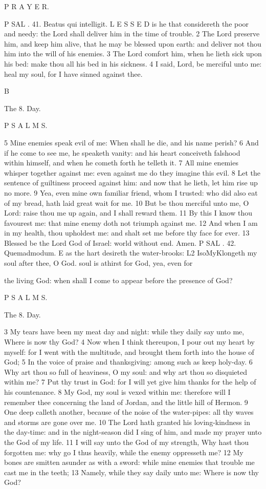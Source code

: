 P R A Y E R.

P SAL . 41. Beatus qui intelligit. L E S S E D is he that considereth the poor and needy: the Lord shall deliver him in the time of trouble. 2 The Lord preserve him, and keep him alive, that he may be blessed upon earth: and deliver not thou him into the will of his enemies. 3 The Lord comfort him, when he lieth sick upon his bed: make thou all his bed in his sickness. 4 I said, Lord, be merciful unto me: heal my soul, for I have sinned against thee.

B

The 8. Day.

P S A L M S.

5 Mine enemies speak evil of me: When shall he die, and his name perish? 6 And if he come to see me, he speaketh vanity: and his heart conceiveth falshood within himself, and when he cometh forth he telleth it. 7 All mine enemies whisper together against me: even against me do they imagine this evil. 8 Let the sentence of guiltiness proceed against him: and now that he lieth, let him rise up no more. 9 Yea, even mine own familiar friend, whom I trusted: who did also eat of my bread, hath laid great wait for me. 10 But be thou merciful unto me, O Lord: raise thou me up again, and I shall reward them. 11 By this I know thou favourest me: that mine enemy doth not triumph against me. 12 And when I am in my health, thou upholdest me: and shalt set me before thy face for ever. 13 Blessed be the Lord God of Israel: world without end. Amen. P SAL . 42. Quemadmodum. E as the hart desireth the water-brooks: L2 IsoMyKlongeth my soul after thee, O God. soul is athirst for God, yea, even for

the living God: when shall I come to appear before the presence of God?

P S A L M S.

The 8. Day.

3 My tears have been my meat day and night: while they daily say unto me, Where is now thy God? 4 Now when I think thereupon, I pour out my heart by myself: for I went with the multitude, and brought them forth into the house of God; 5 In the voice of praise and thanksgiving: among such as keep holy-day. 6 Why art thou so full of heaviness, O my soul: and why art thou so disquieted within me? 7 Put thy trust in God: for I will yet give him thanks for the help of his countenance. 8 My God, my soul is vexed within me: therefore will I remember thee concerning the land of Jordan, and the little hill of Hermon. 9 One deep calleth another, because of the noise of the water-pipes: all thy waves and storms are gone over me. 10 The Lord hath granted his loving-kindness in the day-time: and in the night-season did I sing of him, and made my prayer unto the God of my life. 11 I will say unto the God of my strength, Why hast thou forgotten me: why go I thus heavily, while the enemy oppresseth me? 12 My bones are smitten asunder as with a sword: while mine enemies that trouble me cast me in the teeth; 13 Namely, while they say daily unto me: Where is now thy God?

